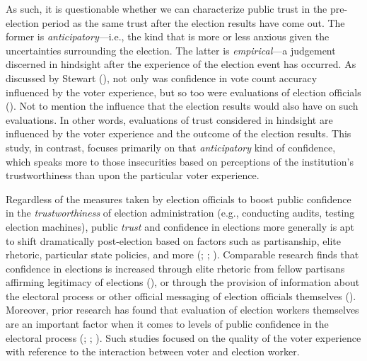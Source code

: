\documentclass[
  12pt,
  letterpaper,
]{article}
\begin{document}
As such, it is questionable whether we can characterize public trust in
the pre-election period as the same trust after the election results
have come out. The former is \emph{anticipatory}---i.e., the kind that
is more or less anxious given the uncertainties surrounding the
election. The latter is \emph{empirical}---a judgement discerned in
hindsight after the experience of the election event has occurred. As
discussed by Stewart (), not only was
confidence in vote count accuracy influenced by the voter experience,
but so too were evaluations of election officials
(). Not to mention the
influence that the election results would also have on such evaluations.
In other words, evaluations of trust considered in hindsight are
influenced by the voter experience and the outcome of the election
results. This study, in contrast, focuses primarily on that
\emph{anticipatory} kind of confidence, which speaks more to those
insecurities based on perceptions of the institution's trustworthiness
than upon the particular voter experience.

Regardless of the measures taken by election officials to boost public
confidence in the \emph{trustworthiness} of election administration
(e.g., conducting audits, testing election machines), public
\emph{trust} and confidence in elections more generally is apt to shift
dramatically post-election based on factors such as partisanship, elite
rhetoric, particular state policies, and more
(;
;
). Comparable research
finds that confidence in elections is increased through elite rhetoric
from fellow partisans affirming legitimacy of elections
(), or through the
provision of information about the electoral process or other official
messaging of election officials themselves
(). Moreover, prior
research has found that evaluation of election workers themselves are an
important factor when it comes to levels of public confidence in the
electoral process (;
;
).
Such studies focused on the quality of the voter experience with
reference to the interaction between voter and election worker.
\end{document}
